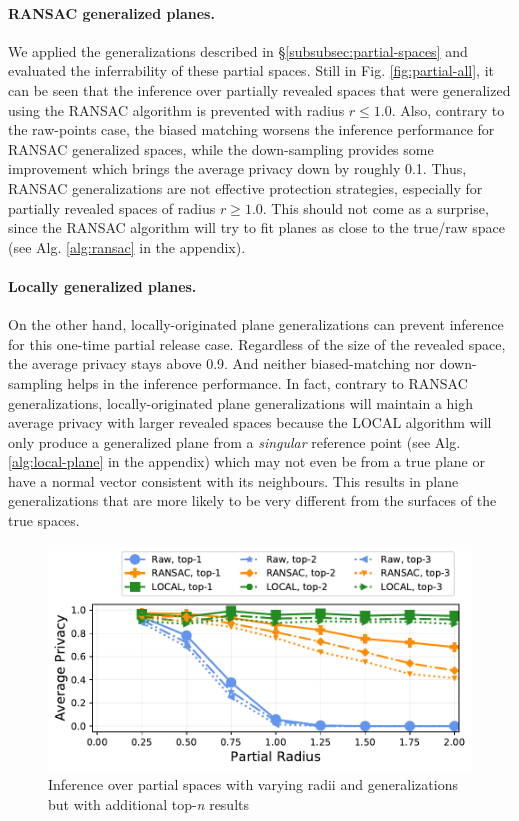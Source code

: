 \paragraph{RANSAC generalized planes.} We applied the generalizations described in \S\ref{subsubsec:partial-spaces} and evaluated the inferrability of these partial spaces. Still in Fig. \ref{fig:partial-all}, it can be seen that the inference over partially revealed spaces that were generalized using the RANSAC algorithm is prevented with radius $r \leq 1.0$. Also, contrary to the raw-points case, the biased matching worsens the inference performance for RANSAC generalized spaces, while the down-sampling provides some improvement which brings the average privacy down by roughly 0.1. Thus, RANSAC generalizations are not effective protection strategies, especially for partially revealed spaces of radius $r \geq 1.0$. This should not come as a surprise, since the RANSAC algorithm will try to fit planes as close to the true/raw space (see Alg. \ref{alg:ransac} in the appendix).

\paragraph{Locally generalized planes.} On the other hand, locally-originated plane generalizations can prevent inference for this one-time partial release case. Regardless of the size of the revealed space, the average privacy stays above 0.9. And neither biased-matching nor down-sampling helps in the inference performance. In fact, contrary to RANSAC generalizations, locally-originated plane generalizations will maintain a high average privacy with larger revealed spaces because the LOCAL algorithm will only produce a generalized plane from a \textit{singular} reference point (see Alg. \ref{alg:local-plane} in the appendix) which may not even be from a true plane or have a normal vector consistent with its neighbours. This results in plane generalizations that are more likely to be very different from the surfaces of the true spaces.

\begin{figure}[t!]
	\centering
	\vspace{-2mm}
	\includegraphics[width=\columnwidth]{figures/plots/2-partials-ranked.pdf}
	\caption{Inference over partial spaces with varying radii and generalizations but with additional top-\textit{n} results}
	\vspace{-2mm}
	\label{fig:partials-ranked}
\end{figure}

